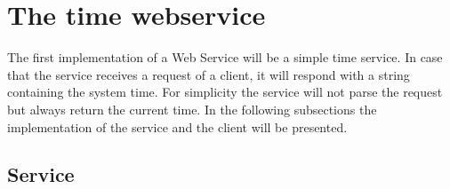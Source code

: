 \chapter{The time webservice}


The first implementation of a Web Service will be a simple time service. 
In case that the service receives a request of a client, it will respond with a string containing the system time.
For simplicity the service will not parse the request but always return the current time.
In the following subsections the implementation of the service and the client will be presented. 


\section{Service}

